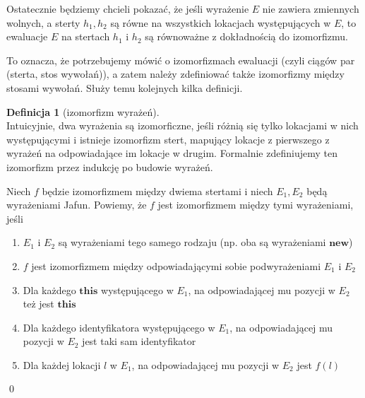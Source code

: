 \documentclass[]{pracamgr}
\renewcommand \| {\hspace{0.75em} | \hspace{0.75em} }
\renewcommand \[ {[\![}
\renewcommand \] {]\!]}
\theoremstyle{definition}
\newtheorem{definition}{Definicja}[section]
\newcommand{\jnew}{\mathbf{new}\xspace}
\newcommand{\jthis}{\textbf{this}\xspace}
\begin{document}
Ostatecznie będziemy chcieli pokazać, że jeśli wyrażenie $E$ nie zawiera zmiennych wolnych,
a sterty $h_1, h_2$ są równe na wszystkich lokacjach występujących w $E$, to
ewaluacje $E$ na stertach $h_1$ i $h_2$ są równoważne z dokładnością do izomorfizmu.

To oznacza, że potrzebujemy mówić o izomorfizmach ewaluacji (czyli ciągów par (sterta, stos wywołań)),
a zatem należy zdefiniować także izomorfizmy między stosami wywołań.
Służy temu kolejnych kilka definicji.

\begin{definition}[izomorfizm wyrażeń] {\ } \\
Intuicyjnie, dwa wyrażenia są izomorficzne, jeśli różnią się tylko lokacjami w nich występującymi i istnieje
izomorfizm stert, mapujący lokacje z pierwszego z wyrażeń na odpowiadające im lokacje w drugim.
Formalnie zdefiniujemy ten izomorfizm przez indukcję po budowie wyrażeń.

Niech $f$ będzie izomorfizmem między dwiema stertami i niech $E_1, E_2$ będą wyrażeniami Jafun.
Powiemy, że $f$ jest izomorfizmem między tymi wyrażeniami, jeśli
\begin{enumerate}
 \item $E_1$ i $E_2$ są wyrażeniami tego samego rodzaju (np. oba są wyrażeniami $\jnew$)
 \item $f$ jest izomorfizmem między odpowiadającymi sobie podwyrażeniami $E_1$ i $E_2$
 \item Dla każdego $\jthis$ występującego w $E_1$, na odpowiadającej mu pozycji w $E_2$ też jest $\jthis$
 \item Dla każdego identyfikatora występującego w $E_1$, na odpowiadającej mu pozycji w $E_2$ jest taki sam identyfikator
 \item Dla każdej lokacji $l$ w $E_1$, na odpowiadającej mu pozycji w $E_2$ jest $f(l)$
\end{enumerate}
\qed
\end{definition}
\end{document}
